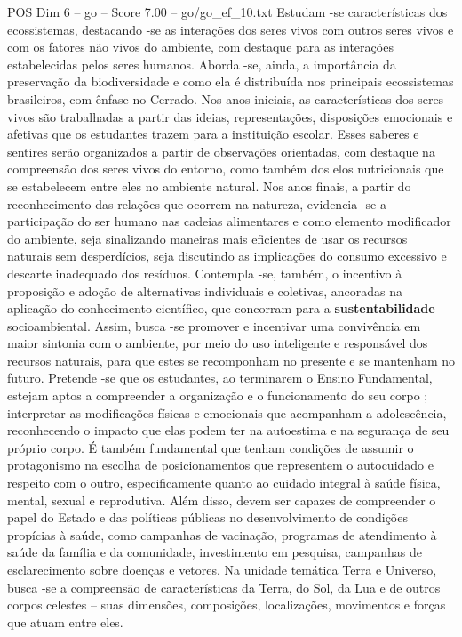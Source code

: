 \begin{textsample}{POS Dim 6 – go – Score 7.00 – go/go\_ef\_10.txt}
Estudam -se características dos ecossistemas, destacando -se as interações dos seres vivos com outros seres vivos e com os fatores não vivos do ambiente, com destaque para as interações estabelecidas pelos seres humanos.
Aborda -se, ainda, a importância da preservação da biodiversidade e como ela é distribuída nos principais ecossistemas brasileiros, com ênfase no Cerrado.
Nos anos iniciais, as características dos seres vivos são trabalhadas a partir das ideias, representações, disposições emocionais e afetivas que os estudantes trazem para a instituição escolar.
Esses saberes e sentires serão organizados a partir de observações orientadas, com destaque na compreensão dos seres vivos do entorno, como também dos elos nutricionais que se estabelecem entre eles no ambiente natural.
Nos anos finais, a partir do reconhecimento das relações que ocorrem na natureza, evidencia -se a participação do ser humano nas cadeias alimentares e como elemento modificador do ambiente, seja sinalizando maneiras mais eficientes de usar os recursos naturais sem desperdícios, seja discutindo as implicações do consumo excessivo e descarte inadequado dos resíduos.
Contempla -se, também, o incentivo à proposição e adoção de alternativas individuais e coletivas, ancoradas na aplicação do conhecimento científico, que concorram para a \textbf{sustentabilidade} socioambiental.
Assim, busca -se promover e incentivar uma convivência em maior sintonia com o ambiente, por meio do uso inteligente e responsável dos recursos naturais, para que estes se recomponham no presente e se mantenham no futuro.
Pretende -se que os estudantes, ao terminarem o Ensino Fundamental, estejam aptos a compreender a organização e o funcionamento do seu corpo ; interpretar as modificações físicas e emocionais que acompanham a adolescência, reconhecendo o impacto que elas podem ter na autoestima e na segurança de seu próprio corpo.
É também fundamental que tenham condições de assumir o protagonismo na escolha de posicionamentos que representem o autocuidado e respeito com o outro, especificamente quanto ao cuidado integral à saúde física, mental, sexual e reprodutiva.
Além disso, devem ser capazes de compreender o papel do Estado e das políticas públicas no desenvolvimento de condições propícias à saúde, como campanhas de vacinação, programas de atendimento à saúde da família e da comunidade, investimento em pesquisa, campanhas de esclarecimento sobre doenças e vetores.
Na unidade temática Terra e Universo, busca -se a compreensão de características da Terra, do Sol, da Lua e de outros corpos celestes – suas dimensões, composições, localizações, movimentos e forças que atuam entre eles.

\end{textsample}

